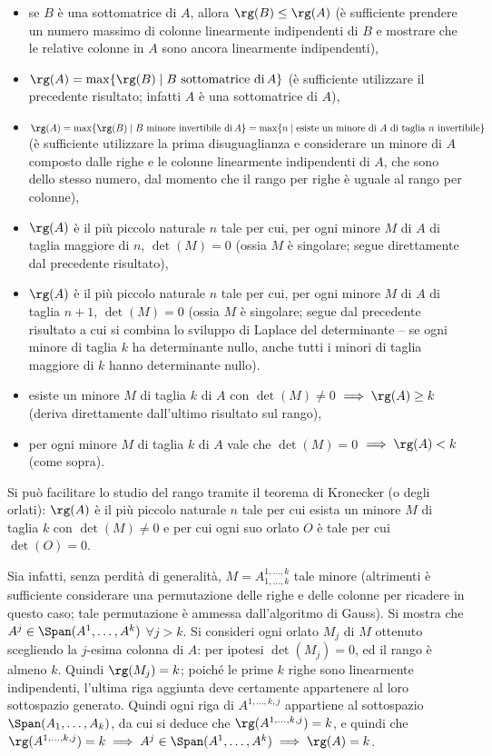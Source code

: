 \documentclass[10pt,landscape]{article}
\begin{document}
\begin{multicols}{3}
		\begin{itemize}
			\item se $B$ è una sottomatrice di $A$, allora $\rg(B) \leq \rg(A)$ (è sufficiente prendere un numero massimo di colonne linearmente indipendenti
			di $B$ e mostrare che le relative colonne in $A$ sono ancora linearmente indipendenti),
			\item $\rg(A) = \max\{\rg(B) \mid B \text{ sottomatrice di }\! A\}$ (è sufficiente utilizzare il precedente risultato; infatti $A$ è una sottomatrice di $A$),
			\item $\rg(A) = \max\{\rg(B) \mid B \text{ minore invertibile di }\! A\} = \max\{n \mid \text{esiste un minore di $A$ di taglia $n$ invertibile} \}$ (è sufficiente utilizzare la prima disuguaglianza e considerare un minore di $A$ composto dalle righe e le colonne linearmente indipendenti di $A$, che sono
			dello stesso numero, dal momento che il rango per righe è uguale al rango per colonne),
			\item $\rg(A)$ è il più piccolo naturale $n$ tale per cui, per ogni minore
			$M$ di $A$ di taglia maggiore di $n$, $\det(M) = 0$ (ossia $M$ è singolare; segue direttamente dal precedente risultato),
			\item $\rg(A)$ è il più piccolo naturale $n$ tale per cui, per ogni minore
			$M$ di $A$ di taglia $n+1$, $\det(M) = 0$ (ossia $M$ è singolare; segue dal precedente risultato a cui si combina lo sviluppo di Laplace del determinante -- se ogni minore di taglia $k$ ha determinante nullo, anche tutti i minori di
			taglia maggiore di $k$ hanno determinante nullo).
			\item esiste un minore $M$ di taglia $k$ di $A$ con $\det(M) \neq 0$ $\implies \rg(A) \geq k$ (deriva direttamente dall'ultimo risultato sul rango),
			\item per ogni minore $M$ di taglia $k$ di $A$ vale che $\det(M) = 0$
			$\implies \rg(A) < k$ (come sopra).
		\end{itemize}
		
		Si può facilitare lo studio del rango tramite il teorema di Kronecker (o degli orlati): $\rg(A)$ è il più piccolo naturale $n$ tale per cui esista un minore
		$M$ di taglia $k$ con $\det(M) \neq 0$ e per cui ogni suo orlato $O$ è tale
		per cui $\det(O) = 0$.
		
		Sia infatti, senza perdità di generalità, $M = A^{1,\ldots, k}_{1,\ldots,k}$ tale minore (altrimenti è sufficiente considerare una permutazione delle righe e
		delle colonne per ricadere in questo caso; tale permutazione è ammessa dall'algoritmo di Gauss). Si mostra che $A^j \in \Span(A^1, \ldots, A^k)$ $\forall j > k$. Si consideri ogni orlato $M_j$ di $M$ ottenuto scegliendo
		la $j$-esima colonna di $A$: per ipotesi $\det(M_j) = 0$, ed il rango è almeno
		$k$. Quindi $\rg(M_j) = k$; poiché le prime $k$ righe sono linearmente indipendenti, l'ultima riga aggiunta deve certamente appartenere al loro
		sottospazio generato. Quindi ogni riga di $A^{1,\ldots, k, j}$ appartiene
		al sottospazio $\Span(A_1, \ldots, A_k)$, da cui si deduce che $\rg(A^{1,\ldots, k, j}) = k$, e quindi che $\rg(A^{1,\ldots,k,j}) = k \implies A^j \in \Span(A^1, \ldots, A^k) \implies \rg(A) = k$.
		

\end{multicols}
\end{document}
